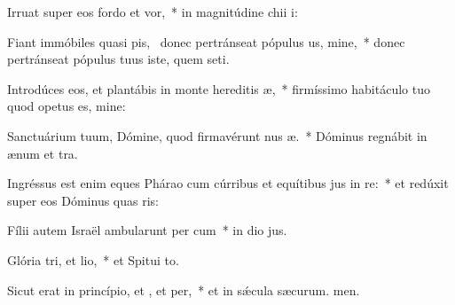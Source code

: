 \item Irruat super eos fordo et vor,~* in magnitúdine chii i:
\item Fiant immóbiles quasi pis,~\pscross{} donec pertránseat pópulus us, mine,~* donec pertránseat pópulus tuus iste, quem seti.
\item Introdúces eos, et plantábis in monte hereditis æ,~* firmíssimo habitáculo tuo quod opetus es, mine:
\item Sanctuárium tuum, Dómine, quod firmavérunt nus æ.~* Dóminus regnábit in ænum et tra.
\item Ingréssus est enim eques Phárao cum cúrribus et equítibus jus in re:~* et redúxit super eos Dóminus quas ris:
\item Fílii autem Israël ambularunt per cum~* in dio jus.
\item Glória tri, et lio,~* et Spitui to.
\item Sicut erat in princípio, et , et per,~* et in sǽcula sæcurum. men.
